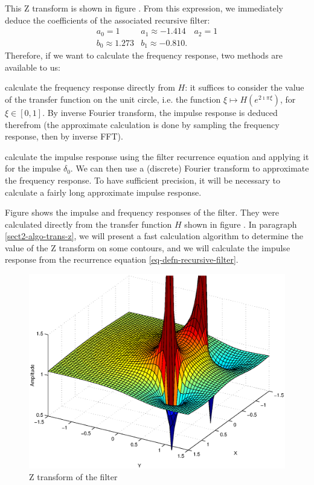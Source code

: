 This Z transform is shown in figure . From this expression, we immediately deduce the coefficients of the associated recursive filter:
\begin{equation*}
\begin{array}{ccc} a_0 = 1 & a_1 \approx -1.414 & a_2 = 1 \\b_0 \approx 1.273 & b_1 \approx -0.810. & \end{array}
\end{equation*}
Therefore, if we want to calculate the frequency response, two methods are available to us: \begin{rs}
\item {} calculate the frequency response directly from $ H $: it suffices to consider the value of the transfer function on the unit circle, i.e. the function $ \xi \mapsto H (e^{2 \imath \pi \xi}) $, for $ \xi \in [0,1] $. By inverse Fourier transform, the impulse response is deduced therefrom (the approximate calculation is done by sampling the frequency response, then by inverse FFT).
\item calculate the impulse response using the filter recurrence equation and applying it for the impulse $ \delta_0 $. We can then use a (discrete) Fourier transform to approximate the frequency response. To have sufficient precision, it will be necessary to calculate a fairly long approximate impulse response.
\end{rs} Figure  shows the impulse and frequency responses of the filter. They were calculated directly from the transfer function $ H $ shown in figure . In paragraph \ref{sect2-algo-trans-z}, we will present a fast calculation algorithm to determine the value of the Z transform on some contours, and we will calculate the impulse response from the recurrence equation \eqref{eq-defn-recursive-filter}. \begin{figure}[ht]
    \begin{center}
    \includegraphics[scale=0.5]{images/notch-filter-trans-z.eps}
    \end{center}
    \caption{Z transform of the filter}
              \label{fig-notch-filter-trans-z}
\end{figure}
